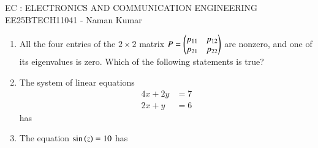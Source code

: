 \documentclass[a4paper, 11pt]{article}
\begin{document}
\begin{center}
    \huge{EC : ELECTRONICS AND COMMUNICATION ENGINEERING}\\
    \large{EE25BTECH11041 - Naman Kumar}
\end{center}

\begin{enumerate}
    \item All the four entries of the $2\times2$ matrix $P=\begin{pmatrix}p_{11} & p_{12} \\ p_{21} & p_{22}\end{pmatrix}$ are nonzero, and one of its eigenvalues is zero. Which of the following statements is true?
    
    \begin{enumerate}
    \end{enumerate}

    \hfill{}

    \item The system of linear equations
    \begin{align*}
        4x+2y &= 7 \\
        2x+y &= 6
    \end{align*}
    has
    
    \begin{enumerate}
    \end{enumerate}
    
    \hfill{}

    \item The equation $\sin\left(z\right)=10$ has
    
    \begin{enumerate}
    \end{enumerate}
    

\end{enumerate}
\end{document}
